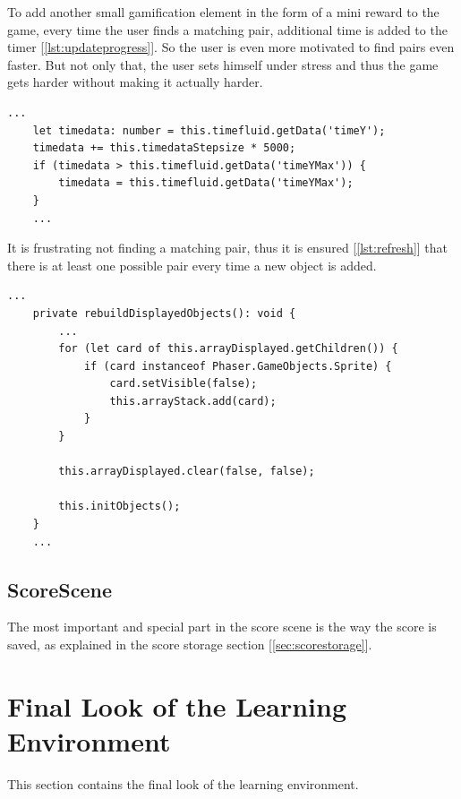 To add another small gamification element in the form of a mini reward to the game, every time the user finds a matching
pair, additional time is added to the timer [\ref{lst:updateprogress}].
So the user is even more motivated to find pairs even faster.
But not only that, the user sets himself under stress and thus the game gets harder without making it actually harder.

\begin{lstlisting}[style=TypeScript, caption={updateProgressbar (gameScene.ts)}, label={lst:updateprogress}]
    ...
    let timedata: number = this.timefluid.getData('timeY');
    timedata += this.timedataStepsize * 5000;
    if (timedata > this.timefluid.getData('timeYMax')) {
        timedata = this.timefluid.getData('timeYMax');
    }
    ...
\end{lstlisting}

It is frustrating not finding a matching pair, thus
it is ensured [\ref{lst:refresh}] that there is at least one possible pair every time a new object is added.

\begin{lstlisting}[style=TypeScript, caption={Refreshing the current set of objects (gameScene.ts)}, label={lst:refresh}]
    ...
    private rebuildDisplayedObjects(): void {
        ...
        for (let card of this.arrayDisplayed.getChildren()) {
            if (card instanceof Phaser.GameObjects.Sprite) {
                card.setVisible(false);
                this.arrayStack.add(card);
            }
        }

        this.arrayDisplayed.clear(false, false);

        this.initObjects();
    }
    ...
\end{lstlisting}

\subsection{ScoreScene}\label{subsec:scorescene}
The most important and special part in the score scene is the way the score is saved,
as explained in the score storage section [\ref{sec:scorestorage}].

\section{Final Look of the Learning Environment}\label{sec:final-look-of-the-learning-environment}
This section contains the final look of the learning environment.

